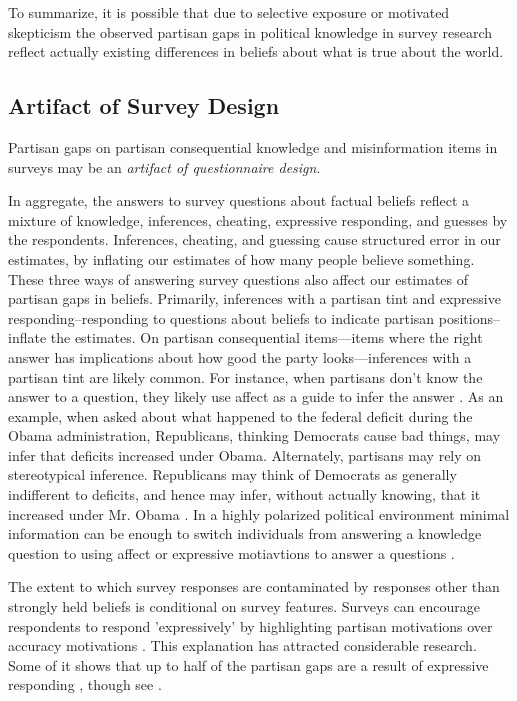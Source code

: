 \documentclass[12pt, letterpaper]{article}
\begin{document}
To summarize, it is possible that due to selective exposure or motivated skepticism the observed partisan gaps in political knowledge in survey research reflect actually existing differences in beliefs about what is true about the world.

\subsection*{Artifact of Survey Design}
Partisan gaps on partisan consequential knowledge and misinformation items in surveys may be an \emph{artifact of questionnaire design}.

In aggregate, the answers to survey questions about factual beliefs reflect a mixture of knowledge, inferences, cheating, expressive responding, and guesses by the respondents. Inferences, cheating, and guessing cause structured error in our estimates, by inflating our estimates of how many people believe something. These three ways of answering survey questions also affect our estimates of partisan gaps in beliefs. Primarily, inferences with a partisan tint and expressive responding--responding to questions about beliefs to indicate partisan positions--inflate the estimates. On partisan consequential items---items where the right answer has implications about how good the party looks---inferences with a partisan tint are likely common. For instance, when partisans don't know the answer to a question, they likely use affect as a guide to infer the answer \citep{malka2022expressive}. As an example, when asked about what happened to the federal deficit during the Obama administration, Republicans, thinking Democrats cause bad things, may infer that deficits increased under Obama. Alternately, partisans may rely on stereotypical inference. Republicans may think of Democrats as generally indifferent to deficits, and hence may infer, without actually knowing, that it increased under Mr. Obama \citep[e.g.][]{rahn1993role, goggin2020goes}. In a highly polarized political environment minimal information can be enough to switch individuals from answering a knowledge question to using affect or expressive motiavtions to answer a questions \citep{merkley2018party}.

The extent to which survey responses are contaminated by responses other than strongly held beliefs is conditional on survey features. Surveys can encourage respondents to respond 'expressively' by highlighting partisan motivations over accuracy motivations \citep{Zaller1992}. This explanation has attracted considerable research. Some of it shows that up to half of the partisan gaps are a result of expressive responding \citep{bullocketal_2015,huber_yair_2018, prior2015you}, though see \citet{berinsky_2017}.
\end{document}
